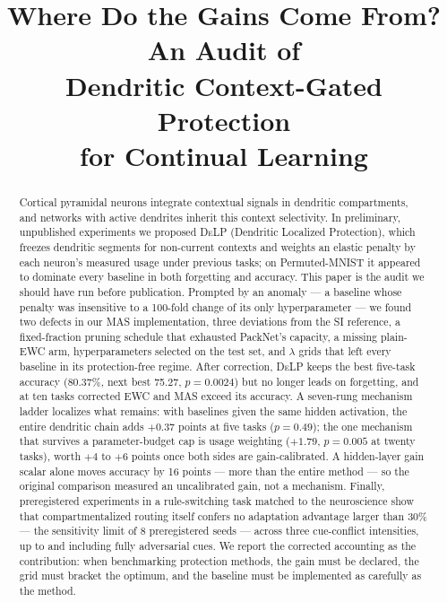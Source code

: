 \documentclass[conference]{IEEEtran}
\newcommand{\delp}{\textsc{DeLP}}
\begin{document}
\title{Where Do the Gains Come From? An Audit of\\ Dendritic Context-Gated Protection\\ for Continual Learning}

\author{
}

\maketitle

\begin{abstract}
Cortical pyramidal neurons integrate contextual signals in dendritic compartments, and networks
with active dendrites inherit this context selectivity. In preliminary, unpublished experiments we
proposed \delp{}
(Dendritic Localized Protection), which freezes dendritic segments for non-current contexts and
weights an elastic penalty by each neuron's measured usage under previous tasks; on Permuted-MNIST
it appeared to dominate every baseline in both forgetting and accuracy. This paper is the audit we
should have run before publication. Prompted by an anomaly --- a baseline whose penalty was insensitive to a
100-fold change of its only hyperparameter --- we found two defects in our MAS implementation,
three deviations from the SI reference, a fixed-fraction pruning schedule that exhausted PackNet's
capacity, a missing plain-EWC arm, hyperparameters selected on the test set, and $\lambda$ grids
that left every baseline in its protection-free regime. After correction, \delp{} keeps the best
five-task accuracy (80.37\%, next best 75.27, $p=0.0024$) but no longer leads on forgetting, and at
ten tasks corrected EWC and MAS exceed its accuracy. A seven-rung mechanism ladder localizes what
remains: with baselines given the same hidden activation, the entire dendritic chain adds
$+0.37$ points at five tasks ($p=0.49$); the one mechanism that survives a parameter-budget cap is
usage weighting ($+1.79$, $p=0.005$ at twenty tasks), worth $+4$ to $+6$ points once both sides are
gain-calibrated. A hidden-layer gain scalar alone moves accuracy by 16 points --- more than the
entire method --- so the original comparison measured an uncalibrated gain, not a mechanism.
Finally, preregistered experiments in a rule-switching task matched to the neuroscience show that
compartmentalized routing itself confers no adaptation advantage larger than 30\% --- the
sensitivity limit of 8 preregistered seeds --- across three cue-conflict intensities, up to and
including fully adversarial cues. We report the corrected accounting as the contribution: when
benchmarking protection methods, the gain must be declared, the grid must bracket the optimum, and
the baseline must be implemented as carefully as the method.
\end{abstract}
\end{document}
